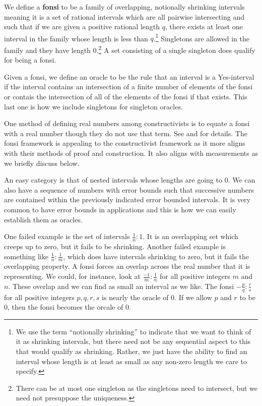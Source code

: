 \documentclass[12pt]{article}
\begin{document}
We define a \textbf{fonsi} to be a family of overlapping, notionally shrinking intervals meaning it is a set of rational intervals which are all pairwise intersecting and such that if we are given a positive rational length $q$, there exists at least one interval in the family whose length is less than $q$.\footnote{We use the term ``notionally shrinking'' to indicate that we want to think of it as shrinking intervals, but there need not be any sequential aspect to this that would qualify as shrinking. Rather, we just have the ability to find an interval whose length is at least as small as any non-zero length we care to specify.} Singletons are allowed in the family and they have length 0.\footnote{There can be at most one singleton as the singletons need to intersect, but we need not presuppose the uniqueness.} A set consisting of a single singleton does qualify for being a fonsi.

Given a fonsi, we define an oracle to be the rule that an interval is a Yes-interval if the interval contains an intersection of a finite number of elements of the fonsi or contais the intersection of all of the elements of the fonsi if that exists. This last one is how we include singletons for singleton oracles. 

One method of defining real numbers among constructivists is to equate a fonsi with a real number though they do not use that term. See \cite{bridger} and \cite{bridges} for details. The fonsi framework is appealing to the constructivist framework as it more aligns with their methods of proof and construction. It also aligns with measurements as we briefly discuss below. 

An easy category is that of nested intervals whose lengths are going to 0. We can also have a sequence of numbers with error bounds such that successive numbers are contained within the previously indicated error bounded intervals.  It is very common to have error bounds in applications and this is how we can easily establish them as oracles. 

One failed example is the set of intervals $\frac{1}{n}:1$. It is an overlapping set which creeps up to zero, but it fails to be shrinking. Another failed example is something like $\frac{1}{n}:\frac{1}{m}$, which does have intervals shrinking to zero, but it fails the overlapping property. A fonsi forces an overlap across the real number that it is representing. We could, for instance, look at $\frac{-1}{m}:\frac{1}{n}$ for all positive integers $m$ and $n$. These overlap and we can find as small an interval as we like. The fonsi $-\frac{p}{q} : \frac{r}{s}$ for all positive integers $p, q, r, s$ is nearly the oracle of 0. If we allow $p$ and $r$ to be 0, then the fonsi becomes the orcale of 0. 
\end{document}
